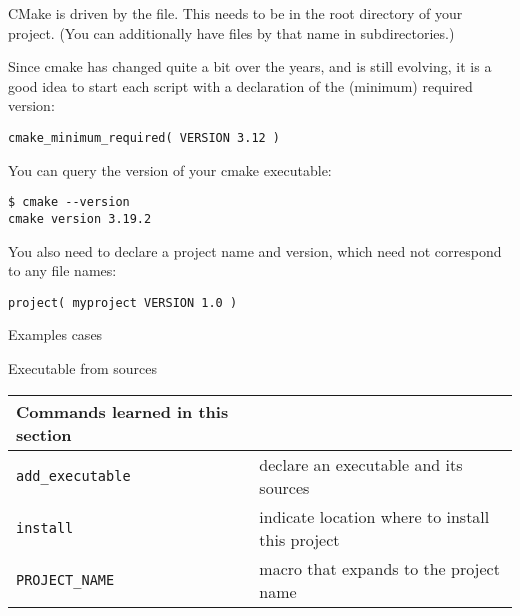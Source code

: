 CMake is driven by the  file.
This needs to be in the root directory of your project.
(You can additionally have files by that name in subdirectories.)

Since cmake has changed quite a bit over the years,
and is still evolving,
it is a good idea to start each script with a declaration
of the (minimum) required version:
\begin{lstlisting}
cmake_minimum_required( VERSION 3.12 )
\end{lstlisting}
You can query the version of your cmake executable:
\begin{verbatim}
$ cmake --version
cmake version 3.19.2
\end{verbatim}

You also need to declare a project name and version,
which need not correspond to any file names:
\begin{lstlisting}
project( myproject VERSION 1.0 )
\end{lstlisting}

\newpage
{} {Examples cases}

 {Executable from sources}

\begin{tabular}{lp{3in}}
  \toprule
  Commands learned in this section\\
  \midrule
  \lstinline+add_executable+&declare an executable and its sources\\
  \lstinline+install+&indicate location where to install this project\\
  \lstinline+PROJECT_NAME+&macro that expands to the project name \\
  \bottomrule
\end{tabular}

